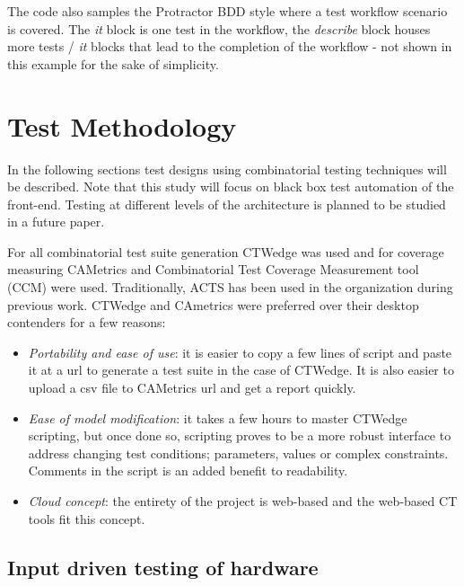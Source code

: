 \documentclass[conference]{IEEEtran}
\begin{document}
	The code also samples the Protractor BDD style where a test workflow scenario is covered. 
	The \textit{it} block is one test in the workflow, the \textit{describe} block houses more tests / \textit{it} blocks that lead to the completion of the workflow - not shown in this example for the sake of simplicity.

\section{Test Methodology}

	In the following sections test designs using combinatorial testing techniques will be described. 
	Note that this study will focus on black box test automation of the front-end. Testing at different levels of the architecture is planned to be studied in a future paper.

	For all combinatorial test suite generation CTWedge \cite{gargantini2018migrating} was used and for coverage measuring CAMetrics \cite{leithner2018cametrics} and Combinatorial Test Coverage Measurement tool (CCM) \cite{kuhn2013combinatorial} were used.
	Traditionally, ACTS \cite{ACTS-tool} has been used in the organization during previous work.
	CTWedge and CAmetrics were preferred over their desktop contenders for a few reasons:

	\begin{itemize}
		\item \textit{Portability and ease of use}: it is easier to copy a few lines of script and paste it at a url to generate a test suite in the case of CTWedge. It is also easier to upload a csv file to CAMetrics url and get a report quickly.
		\item \textit{Ease of model modification}: it takes a few hours to master CTWedge scripting, but once done so, scripting proves to be a more robust interface to address changing test conditions; parameters, values or complex constraints. Comments in the script is an added benefit to readability. 
		\item \textit{Cloud concept}: the entirety of the project is web-based and the web-based CT tools fit this concept.
	\end{itemize}

	\subsection{Input driven testing of hardware} \label{Input driven testing of hardware}
	
\end{document}
